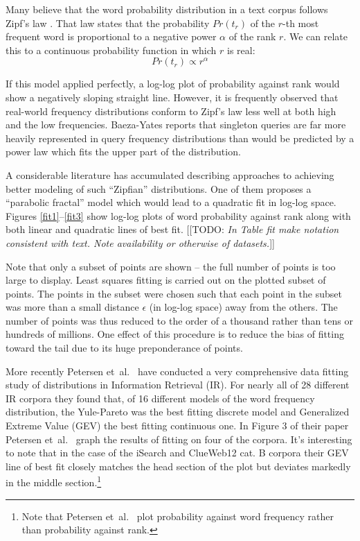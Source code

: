 \documentclass[11pt]{report}
\newcommand{\etal}{et~al.}
\newcommand{\todo}[1]{{\color{blue}[[TODO: {\emph{#1}}]]}}
\begin{document}
Many believe that the word probability distribution in a text corpus
follows Zipf's law \cite{zipf1949humanBehaviour}.  That law states
that the probability $Pr(t_r)$ of the $r$-th most frequent word
is proportional to a negative power $\alpha$ of the rank $r$. We can
relate this to a continuous probability function in which $r$ is real:
\[
Pr(t_r) \propto r^\alpha
\]

If this model applied perfectly, a log-log plot of probability 
against rank would show a negatively sloping straight line. However, it is
frequently observed that real-world frequency distributions
conform to Zipf's law less well at both high and the low frequencies.
Baeza-Yates \cite{baezaYates2015incrementalSamplingOfQueryLogs}
reports that singleton queries are far more heavily represented in 
query frequency distributions than would be predicted by a power law 
which fits the upper part of the distribution.

A considerable literature has accumulated describing approaches to
achieving better modeling of such ``Zipfian'' distributions.  One of
them \cite{Laherrere1996} proposes a ``parabolic fractal'' model which
would lead to a quadratic fit in log-log space.  Figures
\ref{fit1}--\ref{fit3} show log-log plots of word probability against rank along
with both linear and quadratic lines of best fit.
\todo{In Table fit make notation consistent with text.  Note
  availability or otherwise of datasets.}

Note that only a subset of points are shown -- the full number of
points is too large to display.  Least squares fitting is carried
out on the plotted subset of points.  The points in the subset were
chosen such that each point in the subset was more than a small
distance $\epsilon$ (in log-log space) away from the others.  The
number of points was thus reduced to the order of a thousand rather
than tens or hundreds of millions.  One effect of this procedure
is to reduce the bias of fitting toward the tail due to its huge
preponderance of points.

More recently Petersen \etal~\cite{PetersenSL2016} have conducted a
very comprehensive data fitting study of distributions in Information
Retrieval (IR). For nearly all of 28 different IR corpora they found
that, of 16 different models of the word frequency distribution,
the Yule-Pareto was the best fitting discrete
model and Generalized Extreme Value (GEV) the best fitting continuous
one.  In Figure 3 of their paper Petersen \etal~ graph the results of
fitting on four of the corpora.  It's interesting to note that in the
case of the iSearch and ClueWeb12 cat. B corpora their GEV line of best
fit closely matches the head section of the plot but deviates markedly
in the middle section.\footnote{Note that  Petersen \etal~ plot
  probability against word frequency rather than probability against rank.}
\end{document}
